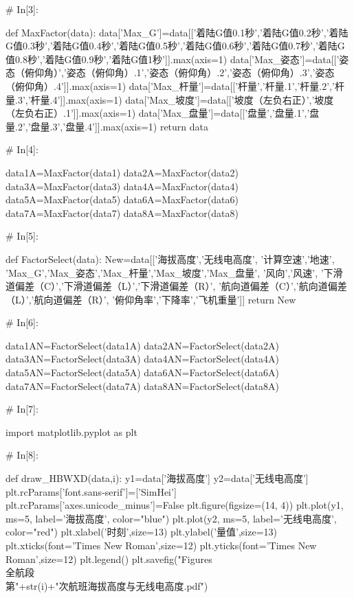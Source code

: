 \documentclass{MathorCupModeling}
\begin{document}
\begin{python}
# In[3]:


def MaxFactor(data):
    data['Max_G']=data[['着陆G值0.1秒','着陆G值0.2秒','着陆G值0.3秒','着陆G值0.4秒','着陆G值0.5秒','着陆G值0.6秒','着陆G值0.7秒','着陆G值0.8秒','着陆G值0.9秒','着陆G值1秒']].max(axis=1)
    data['Max_姿态']=data[['姿态（俯仰角）','姿态（俯仰角）.1','姿态（俯仰角）.2','姿态（俯仰角）.3','姿态（俯仰角）.4']].max(axis=1)
    data['Max_杆量']=data[['杆量','杆量.1','杆量.2','杆量.3','杆量.4']].max(axis=1)
    data['Max_坡度']=data[['坡度（左负右正）','坡度（左负右正）.1']].max(axis=1)
    data['Max_盘量']=data[['盘量','盘量.1','盘量.2','盘量.3','盘量.4']].max(axis=1)
    return data


# In[4]:


data1A=MaxFactor(data1)
data2A=MaxFactor(data2)
data3A=MaxFactor(data3)
data4A=MaxFactor(data4)
data5A=MaxFactor(data5)
data6A=MaxFactor(data6)
data7A=MaxFactor(data7)
data8A=MaxFactor(data8)


# In[5]:


def FactorSelect(data):
    New=data[['海拔高度','无线电高度',
              '计算空速','地速',
              'Max_G','Max_姿态','Max_杆量','Max_坡度','Max_盘量',
              '风向','风速',
              '下滑道偏差（C）','下滑道偏差（L）','下滑道偏差（R）',
              '航向道偏差（C）','航向道偏差（L）','航向道偏差（R）',
              '俯仰角率','下降率','飞机重量']]
    return New


# In[6]:


data1AN=FactorSelect(data1A)
data2AN=FactorSelect(data2A)
data3AN=FactorSelect(data3A)
data4AN=FactorSelect(data4A)
data5AN=FactorSelect(data5A)
data6AN=FactorSelect(data6A)
data7AN=FactorSelect(data7A)
data8AN=FactorSelect(data8A)


# In[7]:


import matplotlib.pyplot as plt


# In[8]:


def draw_HBWXD(data,i):
    y1=data['海拔高度']
    y2=data['无线电高度']
    plt.rcParams['font.sans-serif']=['SimHei']
    plt.rcParams['axes.unicode_minus']=False
    plt.figure(figsize=(14, 4))
    plt.plot(y1, ms=5, label='海拔高度', color="blue")
    plt.plot(y2, ms=5, label='无线电高度', color="red")
    plt.xlabel('时刻',size=13)
    plt.ylabel('量值',size=13)
    plt.xticks(font='Times New Roman',size=12)
    plt.yticks(font='Times New Roman',size=12)
    plt.legend()
    plt.savefig("Figures\\全航段\\第"+str(i)+"次航班海拔高度与无线电高度.pdf")



\end{python}
\end{document}
